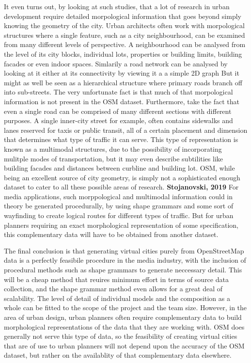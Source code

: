 \documentclass{kththesis}
\begin{document}
It even turns out, by looking at such studies, that a lot of research in urban development require detailed morpological information that goes beyond simply knowing the geometry of the city.
Urban architects often work with morpological structures where a single feature, such as a city neighbourhood, can be examined from many different levels of perspective.
A neighbourhood can be analysed from the level of its city blocks, individual lots, properties or building limits, building facades or even indoor spaces.
Simlarily a road network can be analysed by looking at it either at its connectivity by viewing it a a simple 2D graph
But it might as well be seen as a hierarchical structure where primary roads branch off into sub-streets. 
The very unfortunate fact is that much of that morpological information is not present in the OSM dataset.
Furthermore, take the fact that even a single road can be comprised of many different sections with different purposes.
A single inner-city street for example, often contains sidewalks and lanes reserved for taxis or public transit, all of a certain placement and dimension that determines what type of traffic it can serve.
This type of representation is known as a multimodal structures, due to the possibility of incorporating mulitple modes of transportation, but it may even describe subtilities like building facades and distances between curbline and building lot.
OSM, while being an excellent source of city geometry, is simply not a sophisticated enough dataset to cater to all these possible areas of research.
\textbf{Stojanovski, 2019}
For media applications, such morppological and multimodal information could in theory be generated procedurally, by using shape grammars and some sort of wayfinding to create logical routes for different types of traffic.
But for urban planners requiring an exact morphological representation of some specification, this complementary data will have to be obtained from another dataset.

The final conclusion is that generating virtual cities purely from OpenStreetMap data is a perfectly feasibile procedure in the media industry, with the inclusion of procedural methods such as shape grammars to generate neccessary detail.
This will be a cheap method that reuires minimum effort in terms of source data collection, and the shape grammar method even allows for a great deal of scalability.
The level of detail of individual models and the composition as a whole can be fitted to the scope of the project and the team size.
However, in the area of urban design, urban planners often require complementary data to build morphological representations of the data that they are working with.
OSM does generally not serve this type of data, so the feasibility of creating virtual cities that are of use to urban planners will not depend upon the accuracy of the OSM dataset, but rather on the availablity of that complementary data elsewhere.
\end{document}

